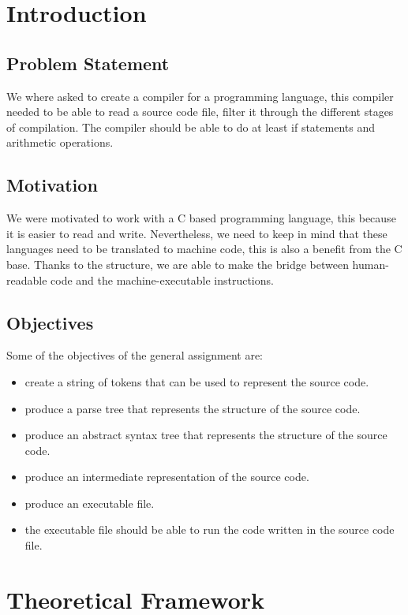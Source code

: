 \documentclass[12pt, letterpaper]{article}
\begin{document}
\section{Introduction}

\subsection*{Problem Statement}

We where asked to create a compiler for a programming language, this compiler needed to be able to read a source code file, filter it through the different stages of compilation. The compiler should be able to do at least if statements and arithmetic operations.

\subsection*{Motivation}

We were motivated to work with a C based programming language, this because it is easier to read and write. Nevertheless, we need to keep in mind that these languages need to be translated to machine code, this is also a benefit from the C base. Thanks to the structure, we are able to make the bridge between human-readable code and the machine-executable instructions.

\subsection*{Objectives}

Some of the objectives of the general assignment are:

\begin{itemize}
	\item create a string of tokens that can be used to represent the source code.
	\item produce a parse tree that represents the structure of the source code.
	\item produce an abstract syntax tree that represents the structure of the source code.
	\item produce an intermediate representation of the source code.
	\item produce an executable file.
	\item the executable file should be able to run the code written in the source code file.
\end{itemize}

\section{Theoretical Framework}
\end{document}

